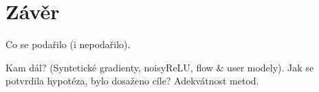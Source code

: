 \chapter*{Závěr}

Co se podařilo (i nepodařilo).

Kam dál? (Syntetické gradienty, noisyReLU, flow \& user modely). Jak se potvrdila hypotéza, bylo dosaženo cíle? Adekvátnost metod.
